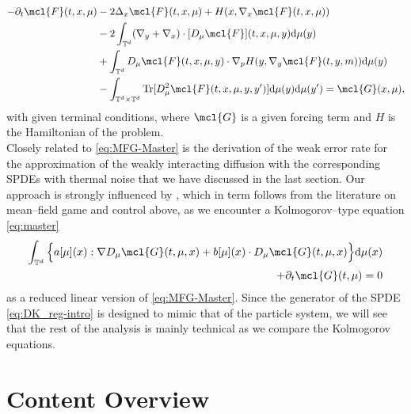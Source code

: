 \begin{align}\label{eq:MFG-Master}
    -\partial_t \mcl{F}(t, x, \mu) & - 2\Delta_x \mcl{F}(t, x, \mu) + H(x, \nabla_x \mcl{F}(t, x, \mu)) \nonumber \\
     & - 2\int_{\mathbb{T}^d} (\nabla_y +  \nabla_x) \cdot [D_{\mu} \mcl{F}](t, x, \mu, y) \mathrm{d}\mu(y) \nonumber\\
     & + \int_{\mathbb{T}^d} D_\mu \mcl{F}(t, x, \mu, y) \cdot \nabla_p H(y, \nabla_y \mcl{F}(t, y, m)) \mathrm{d}\mu(y)\nonumber \\
    &- \int_{\mathbb{T}^d \times \mathbb{T}^d} \mathrm{Tr}[D_{\mu}^2 \mcl{F}(t, x, \mu, y, y')] \mathrm{d}\mu(y) \mathrm{d}\mu(y') = \mcl{G}(x, \mu), 
\end{align}
with given terminal conditions, where $\mcl{G}$ is a given forcing term and $H$ is the Hamiltonian of the problem. \\

Closely related to \eqref{eq:MFG-Master} is the derivation of the weak error rate for the approximation of the weakly interacting diffusion with the corresponding SPDEs with thermal noise that we have discussed in the last section. Our approach is strongly influenced by \cite{T21,CD22}, which in term follows from the literature on mean--field game and control above, as we encounter a Kolmogorov--type equation \eqref{eq:master} 
\begin{align*}
\int_{\mathbb{T}^d} \Big\{a[\mu](x):\nabla D_{\mu}\mcl{G}(t,\mu,x) + b[\mu](x)\cdot D_{\mu}\mcl{G}(t,\mu,x)\Big\}\mathrm{d}\mu(x)\\
+ \partial_t \mcl{G}(t,\mu) = 0
\end{align*}
as a reduced linear version of \eqref{eq:MFG-Master}. Since the generator of the SPDE \eqref{eq:DK_reg-intro} is designed to mimic that of the particle system, we will see that the rest of the analysis is mainly technical as we compare the Kolmogorov equations.
\newpage

\section{Content Overview}

